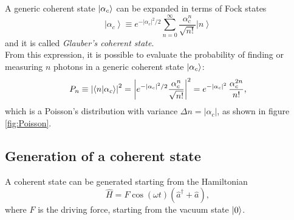 A generic coherent state $\ket{\alpha_c}$ can be expanded in terms of Fock states
\begin{equation}
    \left| \alpha_c \right> \equiv e^{-\left| \alpha_c \right|^2 / 2} \sum_{n=0}^{\infty} \frac{\alpha_c^n}{\sqrt{n!}} \left| n \right>
    \label{eq:cohstate}
\end{equation}
and it is called \textit{Glauber's coherent state}. \\
From this expression, it is possible to evaluate the probability of finding or measuring $n$ photons in a generic coherent state $\ket{\alpha_c}$: 
\begin{equation*}
    P_n \equiv \left| \bra{n}\ket{\alpha_c}\right|^2 = \left| e^{-\left| \alpha_c \right|^2/2} \frac{\alpha_c^n}{\sqrt{n!}}  \right|^2 =  e^{-\left| \alpha_c \right|^2} \, \frac{\alpha_c^{2n}}{n!},
\end{equation*}
which is a Poisson's distribution with variance $\Delta n = | \alpha_c|$, as shown in figure \ref{fig:Poisson}. 

\subsection{Generation of a coherent state}
A coherent state can be generated starting from the Hamiltonian
\begin{equation*}
    \hat{H} = F \cos (\omega t) \left(\hat{a}^{\dagger} + \hat{a}\right), 
\end{equation*}
where $F$ is the driving force, starting from the vacuum state $\ket{0}$.
